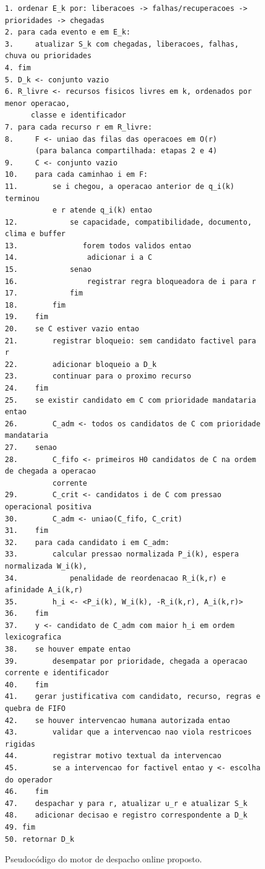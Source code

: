 \documentclass[
  12pt,
  oneside,
  a4paper,
  sumario=tradicional,
  brazil
]{abntex2}
\begin{document}
\begin{figure}[H]
{\begin{minipage}{0.94\textwidth}
\begin{verbatim}
1. ordenar E_k por: liberacoes -> falhas/recuperacoes -> prioridades -> chegadas
2. para cada evento e em E_k:
3.     atualizar S_k com chegadas, liberacoes, falhas, chuva ou prioridades
4. fim
5. D_k <- conjunto vazio
6. R_livre <- recursos fisicos livres em k, ordenados por menor operacao,
      classe e identificador
7. para cada recurso r em R_livre:
8.     F <- uniao das filas das operacoes em O(r)
       (para balanca compartilhada: etapas 2 e 4)
9.     C <- conjunto vazio
10.    para cada caminhao i em F:
11.        se i chegou, a operacao anterior de q_i(k) terminou
           e r atende q_i(k) entao
12.            se capacidade, compatibilidade, documento, clima e buffer
13.               forem todos validos entao
14.                adicionar i a C
15.            senao
16.                registrar regra bloqueadora de i para r
17.            fim
18.        fim
19.    fim
20.    se C estiver vazio entao
21.        registrar bloqueio: sem candidato factivel para r
22.        adicionar bloqueio a D_k
23.        continuar para o proximo recurso
24.    fim
25.    se existir candidato em C com prioridade mandataria entao
26.        C_adm <- todos os candidatos de C com prioridade mandataria
27.    senao
28.        C_fifo <- primeiros H0 candidatos de C na ordem de chegada a operacao
           corrente
29.        C_crit <- candidatos i de C com pressao operacional positiva
30.        C_adm <- uniao(C_fifo, C_crit)
31.    fim
32.    para cada candidato i em C_adm:
33.        calcular pressao normalizada P_i(k), espera normalizada W_i(k),
34.            penalidade de reordenacao R_i(k,r) e afinidade A_i(k,r)
35.        h_i <- <P_i(k), W_i(k), -R_i(k,r), A_i(k,r)>
36.    fim
37.    y <- candidato de C_adm com maior h_i em ordem lexicografica
38.    se houver empate entao
39.        desempatar por prioridade, chegada a operacao corrente e identificador
40.    fim
41.    gerar justificativa com candidato, recurso, regras e quebra de FIFO
42.    se houver intervencao humana autorizada entao
43.        validar que a intervencao nao viola restricoes rigidas
44.        registrar motivo textual da intervencao
45.        se a intervencao for factivel entao y <- escolha do operador
46.    fim
47.    despachar y para r, atualizar u_r e atualizar S_k
48.    adicionar decisao e registro correspondente a D_k
49. fim
50. retornar D_k
\end{verbatim}
\end{minipage}
\par\vspace{2pt}{\color{pequiDark}\rule{0.94\textwidth}{0.8pt}}
}
\caption[Pseudoc\'odigo do motor de despacho]{Pseudoc\'odigo do motor de despacho online proposto.}
\label{fig:motor-despacho}
\end{figure}
\end{document}
